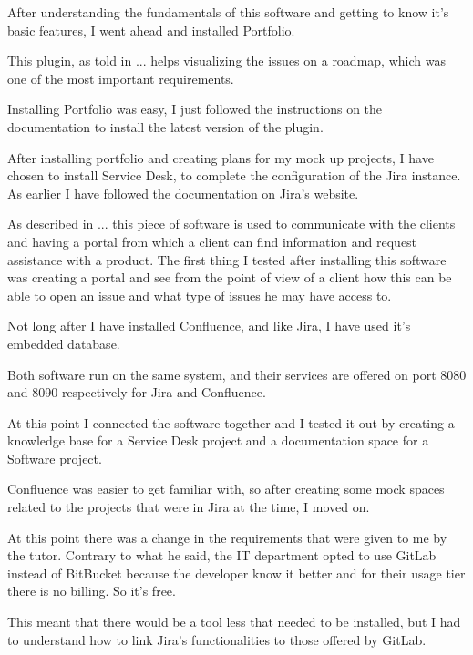 	
	After understanding the fundamentals of this software and getting to know it's basic features, I went ahead and installed Portfolio.
	
	This plugin, as told in ... helps visualizing the issues on a roadmap, which was one of the most important requirements.
	
	Installing Portfolio was easy, I just followed the instructions on the documentation to install the latest version of the plugin.
	
	
	After installing portfolio and creating plans for my mock up projects, I have chosen to install Service Desk, to complete the configuration of the Jira instance.
	As earlier I have followed the documentation on Jira's website.
	
	As described in ... this piece of software is used to communicate with the clients and having a portal from which a client can find information and request assistance with a product.
	The first thing I tested after installing this software was creating a portal and see from the point of view of a client how this can be able to open an issue and what type of issues he may have access to.
	
	
	Not long after I have installed Confluence, and like Jira, I have used it's embedded database.
	
	Both software run on the same system, and their services are offered on port 8080 and 8090 respectively for Jira and Confluence.
	
	At this point I connected the software together and I tested it out by creating a knowledge base for a Service Desk project and a documentation space for a Software project.
	
	Confluence was easier to get familiar with, so after creating some mock spaces related to the projects that were in Jira at the time, I moved on.
	
	At this point there was a change in the requirements that were given to me by the tutor.
	Contrary to what he said, the IT department opted to use GitLab instead of BitBucket because the developer know it better and for their usage tier there is no billing.
	So it's free.
	
	This meant that there would be a tool less that needed to be installed, but I had to understand how to link Jira's functionalities to those offered by GitLab.
	
